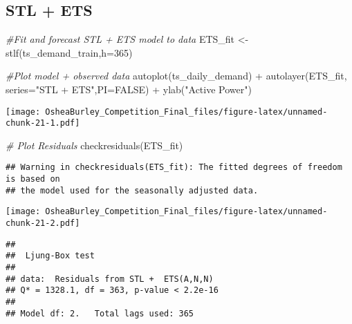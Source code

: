 \documentclass[
]{article}
\newenvironment{Shaded}{\begin{snugshade}}{\end{snugshade}}
\newcommand{\AttributeTok}[1]{\textcolor[rgb]{0.77,0.63,0.00}{#1}}
\newcommand{\CommentTok}[1]{\textcolor[rgb]{0.56,0.35,0.01}{\textit{#1}}}
\newcommand{\ConstantTok}[1]{\textcolor[rgb]{0.00,0.00,0.00}{#1}}
\newcommand{\DecValTok}[1]{\textcolor[rgb]{0.00,0.00,0.81}{#1}}
\newcommand{\FunctionTok}[1]{\textcolor[rgb]{0.00,0.00,0.00}{#1}}
\newcommand{\NormalTok}[1]{#1}
\newcommand{\OtherTok}[1]{\textcolor[rgb]{0.56,0.35,0.01}{#1}}
\newcommand{\SpecialCharTok}[1]{\textcolor[rgb]{0.00,0.00,0.00}{#1}}
\newcommand{\StringTok}[1]{\textcolor[rgb]{0.31,0.60,0.02}{#1}}
\begin{document}
\hypertarget{stl-ets}{%
\subsection{STL + ETS}\label{stl-ets}}

\begin{Shaded}
\begin{Highlighting}[]
\CommentTok{\#Fit and forecast STL + ETS model to data}
\NormalTok{ETS\_fit }\OtherTok{\textless{}{-}}  \FunctionTok{stlf}\NormalTok{(ts\_demand\_train,}\AttributeTok{h=}\DecValTok{365}\NormalTok{)}

\CommentTok{\#Plot model + observed data}
\FunctionTok{autoplot}\NormalTok{(ts\_daily\_demand) }\SpecialCharTok{+}
  \FunctionTok{autolayer}\NormalTok{(ETS\_fit, }\AttributeTok{series=}\StringTok{"STL + ETS"}\NormalTok{,}\AttributeTok{PI=}\ConstantTok{FALSE}\NormalTok{) }\SpecialCharTok{+}
  \FunctionTok{ylab}\NormalTok{(}\StringTok{"Active Power"}\NormalTok{)}
\end{Highlighting}
\end{Shaded}

\texttt{[image: OsheaBurley\_Competition\_Final\_files/figure-latex/unnamed-chunk-21-1.pdf]}

\begin{Shaded}
\begin{Highlighting}[]
\CommentTok{\# Plot Residuals}
\FunctionTok{checkresiduals}\NormalTok{(ETS\_fit)}
\end{Highlighting}
\end{Shaded}

\begin{verbatim}
## Warning in checkresiduals(ETS_fit): The fitted degrees of freedom is based on
## the model used for the seasonally adjusted data.
\end{verbatim}

\texttt{[image: OsheaBurley\_Competition\_Final\_files/figure-latex/unnamed-chunk-21-2.pdf]}

\begin{verbatim}
## 
##  Ljung-Box test
## 
## data:  Residuals from STL +  ETS(A,N,N)
## Q* = 1328.1, df = 363, p-value < 2.2e-16
## 
## Model df: 2.   Total lags used: 365
\end{verbatim}

\begin{Shaded}
\end{Shaded}
\end{document}
